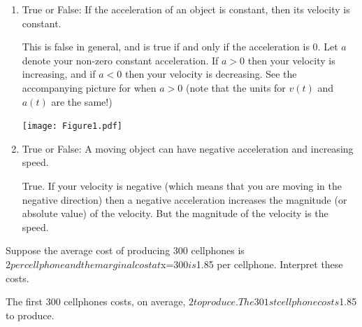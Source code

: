 \documentclass[nooutcomes]{ximera}
\begin{document}
\begin{problem}	
	\begin{enumerate}
	
	\item  True or False:  If the acceleration of an object is constant, then its velocity is constant.

		\begin{freeResponse}
		This is false in general, and is true if and only if the acceleration is 0.  Let $a$ denote your non-zero constant acceleration.  If $a > 0$ then your velocity is increasing, and if $a < 0$ then your velocity is decreasing.  See the accompanying picture for when $a>0$ (note that the units for $v(t)$ and $a(t)$ are  the same!)
		
			\begin{image}
			\texttt{[image: Figure1.pdf]}
			\end{image}
		\end{freeResponse}	
		
		
	
	\item  True or False:  A moving object can have negative acceleration and increasing speed.

		\begin{freeResponse}
		True.  If your velocity is negative (which means that you are moving in the negative direction) then a negative acceleration increases the magnitude (or absolute value) of the velocity.  But the magnitude of the velocity is the speed.
		\end{freeResponse}	
		
		
		
	\end{enumerate}
	
	
\end{problem}	
	
	
\begin{problem}
Suppose the average cost of producing 300 cellphones is $2 per cellphone and the marginal cost at $x=300$ is $1.85 per cellphone.  Interpret these costs.

	\begin{freeResponse}
		The first 300 cellphones costs, on average, $2 to produce.  The 301st cellphone costs $1.85 to produce.
	\end{freeResponse}

\end{problem}
	
\end{document}
